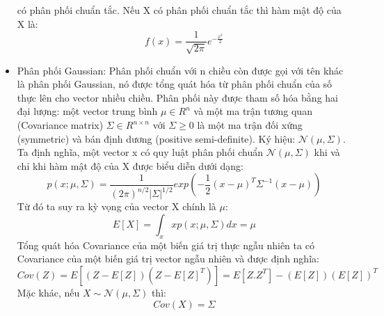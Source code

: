 \begin{itemize}
  có phân phối chuẩn tắc. Nếu X có phân phối chuẩn tắc thì hàm mật độ của X là:
  \[ f(x)=\frac{1}{\sqrt{2\pi}}e^{-\frac{x^2}{2}} \]
  \item Phân phối Gaussian: Phân phối chuẩn với n chiều còn được gọi với tên
  khác là phân phối Gaussian, nó được tổng quát hóa từ phân phối chuẩn của số
  thực lên cho vector nhiều chiều. Phân phối này được tham số hóa bằng hai đại
  lượng: một vector trung bình $\mu \in R^n$ và một ma trận tương quan
  (Covariance matrix) $\Sigma \in R^{n \times n}$ với $\Sigma \geq 0$ là một ma
  trận đối xứng (symmetric) và bán định dương (positive semi-definite). Ký hiệu:
  $\mathcal{N} (\mu, \Sigma)$.\\
  Ta định nghĩa, một vector x có quy luật phân phối chuẩn $\mathcal{N} (\mu,
  \Sigma)$ khi và chỉ khi hàm mật độ của X được biểu diễn dưới dạng:
  \[ p(x;\mu,\Sigma) = \frac{1}{(2\pi)^{n/2}|\Sigma|^{1/2}} exp\left(
  -\frac{1}{2}(x-\mu)^T\Sigma^{-1}(x-\mu) \right) \] Từ đó ta suy ra kỳ vọng của
  vector X chính là $\mu$:
  \[ E[X] = \int_x xp(x;\mu,\Sigma)dx = \mu \]
  Tổng quát hóa Covariance của một biến giá trị thực ngẫu nhiên ta có Covariance
  của một biến giá trị vector ngẫu nhiên và được định nghĩa:
  \[ Cov(Z) = E[(Z-E[Z])(Z-E[Z]^T)] = E[Z.Z^T] - (E[Z])(E[Z])^T \]
  Mặc khác, nếu $X \sim \mathcal{N}(\mu,\Sigma)$ thì: 
  \[ Cov(X) = \Sigma \]
\end{itemize}

